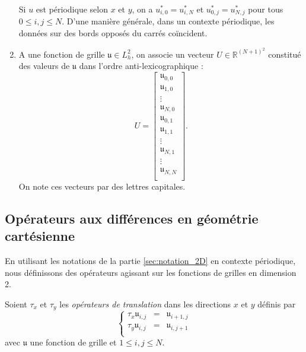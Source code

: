 \begin{enumerate}
Si $u$ est périodique selon $x$ et $y$, on a $u^*_{i,0}=u^*_{i,N}$ et $u^*_{0,j}=u^*_{N,j}$ pour tous $0 \leq i,j \leq N$.
D'une manière générale, dans un contexte périodique, les données sur des bords opposés du carrés coïncident.





\item A une fonction de grille $\mathfrak{u} \in L^2_h$, on associe un vecteur $U \in \mathbb{R}^{(N+1)^2}$ constitué des valeurs de $\mathfrak{u}$ dans l'ordre anti-lexicographique :
\begin{equation}
U = \begin{bmatrix}
\mathfrak{u}_{0,0}\\
\mathfrak{u}_{1,0}\\
\vdots \\
\mathfrak{u}_{N,0}\\
\mathfrak{u}_{0,1}\\
\mathfrak{u}_{1,1}\\
\vdots \\
\mathfrak{u}_{N,1}\\
\vdots \\
\mathfrak{u}_{N,N}\\
\end{bmatrix}.
\end{equation}
On note ces vecteurs par des lettres capitales.
\end{enumerate}















%
\subsection{Opérateurs aux différences en géométrie cartésienne}

En utilisant les notations de la partie \ref{sec:notation_2D} en contexte périodique, nous définissons des opérateurs agissant sur les fonctions de grilles en dimension 2.

\begin{definition}
Soient $\tau_x$ et $\tau_y$ les \textit{opérateurs de translation} dans les directions $x$ et $y$ définis par
\begin{equation}
\left\lbrace
\begin{array}{rcl}
\tau_x \mathfrak{u}_{i,j} & = & \mathfrak{u}_{i+1,j}\\
\tau_y \mathfrak{u}_{i,j} & = & \mathfrak{u}_{i,j+1}\\
\end{array}
\right.
\end{equation}
avec $\mathfrak{u}$ une fonction de grille et $1 \leq i,j \leq N$.
\end{definition}


